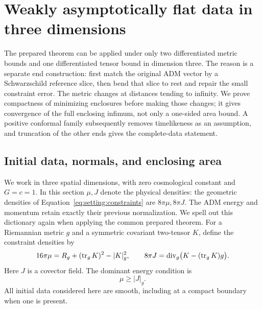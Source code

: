 \section{Weakly asymptotically flat data in three dimensions}
\label{sec:weak3}\label{n3:intro:section}\label{n3:reduction:section}

The prepared theorem can be applied under only two differentiated metric
bounds and one differentiated tensor bound in dimension three. The reason
is a separate end construction: first match the original ADM vector by a
Schwarzschild reference slice, then bend that slice to rest and repair the
small constraint error. The metric changes at distances tending to infinity.
We prove compactness of minimizing enclosures before making those changes;
it gives convergence of the full enclosing infimum, not only a one-sided
area bound. A positive conformal family subsequently removes timelikeness
as an assumption, and truncation of the other ends gives the complete-data
statement.

\subsection{Initial data, normals, and enclosing area}

We work in three spatial dimensions, with zero cosmological constant and
\(G=c=1\). In this section $\mu,J$ denote the physical densities:
the geometric densities of Equation~\eqref{eq:setting:constraints} are
$8\pi\mu,8\pi J$. The ADM energy and momentum retain exactly their
previous normalization. We spell out this dictionary again when applying
the common prepared theorem. For a Riemannian metric \(g\) and a symmetric covariant
two-tensor \(K\), define the constraint densities by
\begin{equation}\label{n3:intro:constraints}
 16\pi\mu=R_g+(\operatorname{tr}_gK)^2-|K|_g^2,\qquad
 8\pi J=\operatorname{div}_g\bigl(K-(\operatorname{tr}_gK)g\bigr).
\end{equation}
Here \(J\) is a covector field. The dominant energy condition is
\begin{equation}\label{n3:intro:dec}
                         \mu\ge |J|_g.
\end{equation}
All initial data considered here are smooth, including at a compact
boundary when one is present.

